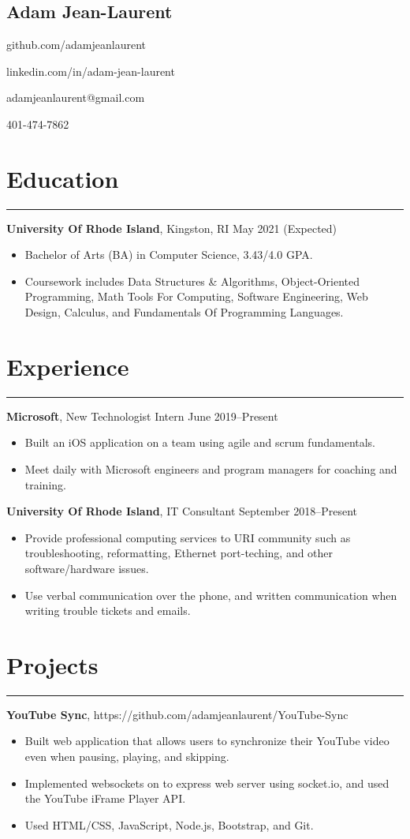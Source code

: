 \documentclass[11pt]{article}
\newcommand{\name}[1]{\begin{center}\section*{\huge #1}\end{center}}
\newcommand{\topinfo}[1]{\begin{center}\vspace{-0.2cm}#1\vspace{-0.2cm}\end{center}}
\newcommand{\resumesection}[1]{\vspace{-0.2cm}\section*{#1}\vspace{-0.2cm}\hrule\vspace{0.2cm}}
\begin{document}
\name{Adam Jean-Laurent}
\topinfo{github.com/adamjeanlaurent}
\topinfo{linkedin.com/in/adam-jean-laurent}
\topinfo{adamjeanlaurent@gmail.com}
\topinfo{401-474-7862}

\resumesection{Education}

\textbf{University Of Rhode Island}, Kingston, RI \hfill May 2021 (Expected)
\begin{itemize}
	\item Bachelor of Arts (BA) in Computer Science, 3.43/4.0 GPA.
	\item Coursework includes Data Structures \& Algorithms, Object-Oriented Programming, Math Tools For Computing, Software Engineering, Web Design, Calculus, and Fundamentals Of Programming Languages. 
\end{itemize}

\resumesection{Experience}

\textbf{Microsoft}, New Technologist Intern \hfill June 2019--Present
\begin{itemize}
	\item Built an iOS application on a team using agile and scrum fundamentals.
	\item Meet daily with Microsoft engineers and program managers for coaching and training.
\end{itemize}

\textbf{University Of Rhode Island}, IT Consultant \hfill September 2018--Present
\begin{itemize}
	\item Provide professional computing services to URI community such as troubleshooting, reformatting, Ethernet port-teching, and other software/hardware issues.
	\item Use verbal communication over the phone, and written communication when writing trouble tickets and emails.
\end{itemize}

\resumesection{Projects}

\textbf{YouTube Sync}, https://github.com/adamjeanlaurent/YouTube-Sync  
\begin{itemize}
	\item Built web application that allows users to synchronize their YouTube video even when pausing, playing, and skipping.
	\item Implemented websockets on to express web server using socket.io, and used the YouTube iFrame Player API.
	\item Used HTML/CSS, JavaScript, Node.js, Bootstrap, and Git.
\end{itemize}
\end{document}
